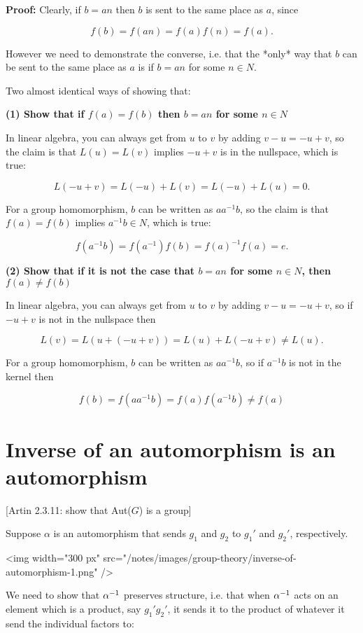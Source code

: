 \textbf{Proof:} Clearly, if $b = an$ then $b$ is sent to the same place as $a$,
since

$$
f(b) = f(an) = f(a)f(n) = f(a).
$$

However we need to demonstrate the converse, i.e. that the *only* way that $b$
can be sent to the same place as $a$ is if $b=an$ for some $n \in N$.

Two almost identical ways of showing that:

\textbf{(1) Show that if $f(a) = f(b)$ then $b = an$ for some $n \in N$}

In linear algebra, you can always get from $u$ to $v$ by adding $v - u = -u +
v$, so the claim is that $L(u) = L(v)$ implies $-u + v$ is in the nullspace,
which is true:

$$
L(-u + v) = L(-u) + L(v) = L(-u) + L(u) = 0.
$$

For a group homomorphism, $b$ can be written as $aa^{-1}b$, so the claim is
that $f(a) = f(b)$ implies $a^{-1}b \in N$, which is true:

$$
f(a^{-1}b) = f(a^{-1})f(b) = f(a)^{-1}f(a) = e.
$$

\textbf{(2) Show that if it is not the case that $b = an$ for some $n \in N$, then $f(a) \neq f(b)$}

In linear algebra, you can always get from $u$ to $v$ by adding $v - u = -u + v$,
so if $-u + v$ is not in the nullspace then

$$
L(v) = L(u + (-u + v)) = L(u) + L(-u + v) \neq L(u).
$$

For a group homomorphism, $b$ can be written as $aa^{-1}b$, so if $a^{-1}b$ is
not in the kernel then

$$
f(b) = f(aa^{-1}b) = f(a)f(a^{-1}b) \neq f(a)
$$


\section{Inverse of an automorphism is an automorphism}

[Artin 2.3.11: show that Aut($G$) is a group]

Suppose $\alpha$ is an automorphism that sends $g_1$ and $g_2$ to $g_1'$ and
$g_2'$, respectively.

<img width="300 px" src="/notes/images/group-theory/inverse-of-automorphism-1.png" />

We need to show that $\alpha^{-1}$ preserves structure, i.e. that when $\alpha^{-1}$ acts
on an element which is a product, say $g_1'g_2'$, it sends it to the product of
whatever it send the individual factors to:


